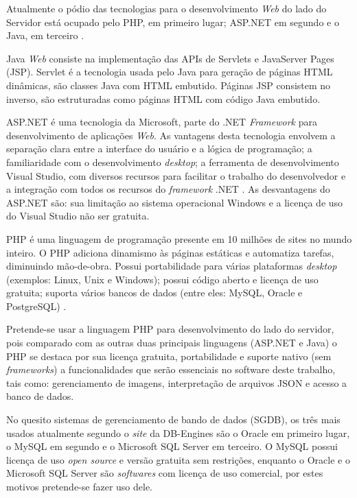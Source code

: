 \begin{description}
Atualmente o pódio das tecnologias para o desenvolvimento \textit{Web} do lado do Servidor está ocupado pelo PHP, em primeiro lugar; ASP.NET em segundo e o Java, em terceiro \cite{w3techs2015}. \par

Java \textit{Web} consiste na implementação das APIs de Servlets e JavaServer Pages (JSP). Servlet é a tecnologia usada pelo Java para geração de páginas HTML dinâmicas, são classes Java com HTML embutido. Páginas JSP consistem no inverso, são estruturadas como páginas HTML com código Java embutido. \par

ASP.NET é uma tecnologia da Microsoft, parte do .NET \textit{Framework} para desenvolvimento de aplicações \textit{Web}. As vantagens desta tecnologia envolvem a separação clara entre a interface do usuário e a lógica de programação; a familiaridade com o desenvolvimento \textit{desktop}; a ferramenta de desenvolvimento Visual Studio, com diversos recursos para facilitar o trabalho do desenvolvedor e a integração com todos os recursos do \textit{framework} .NET \cite{imar2014}. As desvantagens do ASP.NET são: sua limitação ao sistema operacional Windows e a licença de uso do Visual Studio não ser gratuita. \par

PHP é uma linguagem de programação presente em 10 milhões de sites no mundo inteiro. O PHP adiciona dinamismo às páginas estáticas e automatiza tarefas, diminuindo mão-de-obra. Possui portabilidade para várias plataformas \textit{desktop} (exemplos: Linux, Unix e Windows); possui código aberto e licença de uso gratuita; suporta vários bancos de dados (entre eles: MySQL, Oracle e PostgreSQL) \cite{niederauer2004, welling2003}. \par

Pretende-se usar a linguagem PHP para desenvolvimento do lado do servidor, pois comparado com as outras duas principais linguagens (ASP.NET e Java) o PHP se destaca por sua licença gratuita, portabilidade e suporte nativo (sem \textit{frameworks}) a funcionalidades que serão essenciais no software deste trabalho, tais como: gerenciamento de imagens, interpretação de arquivos JSON e acesso a banco de dados. \par

No quesito sistemas de gerenciamento de bando de dados (SGDB), os três mais usados atualmente segundo o \textit{site} da DB-Engines são o Oracle em primeiro lugar, o MySQL em segundo e o Microsoft SQL Server em terceiro. O MySQL possui licença de uso \textit{open source} e versão gratuita sem restrições, enquanto o Oracle e o Microsoft SQL Server são \textit{softwares} com licença de uso comercial, por estes motivos pretende-se fazer uso dele.


\end{description}
